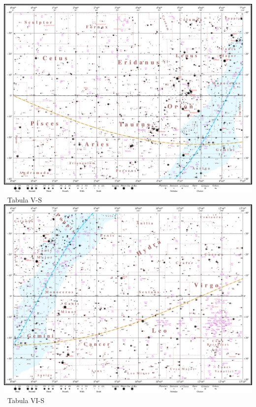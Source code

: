 \documentclass[10pt,landscape,oneside]{article}
\begin{document}
\begin{center}
\noindent\includegraphics[height=0.963\textheight]{TabulaIII_S.pdf}\\[-0.985\textheight]\hfill\large~Tabula V-S\hspace{25mm}
\clearpage
%
\noindent\includegraphics[height=0.963\textheight]{TabulaIV_S.pdf}\\[-0.985\textheight]\hfill\large~Tabula VI-S\hspace{25mm}
\clearpage
%

\end{center}
\end{document}
